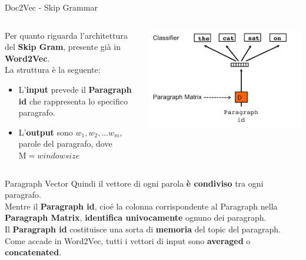 \documentclass[british]{beamer}
\begin{document}
\begin{frame}{Doc2Vec - Skip Grammar}
	\begin{columns}
		\begin{column}{0.5\textwidth}
		Per quanto riguarda l'architettura del \textbf{Skip Gram}, presente gi\`{a} in \textbf{Word2Vec}. \\
		La struttura \`{e} la seguente:
		\begin{itemize}
			\item L'\textbf{input} prevede il \textbf{Paragraph id} che rappresenta lo specifico paragrafo.
			\item L'\textbf{output} sono $w_{1},w_{2},...w_{m}$, parole del paragrafo, dove $\mathrm{M} = window size$
		\end{itemize}
		\end{column}
		\begin{column}{0.5\textwidth}
			\includegraphics[width=\linewidth]{./Imgs/doc2vec-skipgram.png}
		\end{column}
	\end{columns}
\end{frame}

\begin{frame}{Paragraph Vector}
	Quindi il vettore di ogni parola \textbf{\`{e} condiviso} tra ogni paragrafo.\\
	Mentre il \textbf{Paragraph id}, cio\'{e} la colonna corrispondente al Paragraph nella \textbf{\alert{Paragraph Matrix}}, \textbf{identifica univocamente} ognuno dei paragraph. \\
	Il \textbf{Paragraph id} costituisce una sorta di \textbf{memoria} del topic del paragraph. \\
	Come accade in Word2Vec, tutti i vettori di input sono \textbf{averaged} o \textbf{concatenated}.
\end{frame}
\end{document}
